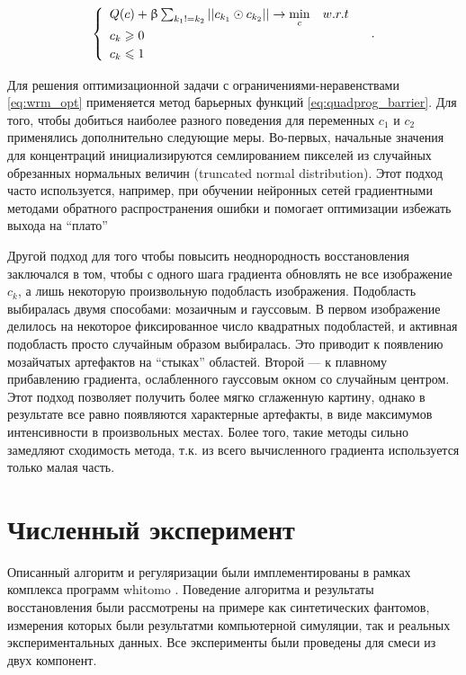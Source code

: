 \begin{equation}
\label{eq:wrm_opt}
  \begin{cases}
    \begin{array}{lc}
    Q(c) + \upbeta\sum_{k_1 != k_2}\left|\left| c_{k_1} \odot c_{k_2} \right|\right| \to \min \limits_c & w.r.t \\
    c_k \geqslant 0 & \\
    c_k \leqslant 1
    \end{array}
  \end{cases}.
\end{equation}

Для решения оптимизационной задачи с ограничениями-неравенствами \eqref{eq:wrm_opt} применяется метод барьерных функций \eqref{eq:quadprog_barrier}.
Для того, чтобы добиться наиболее разного поведения для переменных $c_1$ и $c_2$ применялись дополнительно следующие меры.
Во-первых, начальные значения для концентраций инициализируются семлированием пикселей из случайных обрезанных нормальных величин (truncated normal distribution).
Этот подход часто используется, например, при обучении нейронных сетей градиентными методами обратного распространения ошибки и помогает оптимизации избежать выхода на ``плато''

Другой подход для того чтобы повысить неоднородность восстановления заключался в том, чтобы с одного шага градиента обновлять не все изображение $c_k$, а лишь некоторую произвольную подобласть изображения.
Подобласть выбиралась двумя способами: мозаичным и гауссовым.
В первом изображение делилось на некоторое фиксированное число квадратных подобластей, и активная подобласть просто случайным образом выбиралась.
Это приводит к появлению мозайчатых артефактов на ``стыках'' областей.
Второй --- к плавному прибавлению градиента, ослабленного гауссовым окном со случайным центром.
Этот подход позволяет получить более мягко сглаженную картину, однако в результате все равно появляются характерные артефакты, в виде максимумов интенсивности в произвольных местах.
Более того, такие методы сильно замедляют сходимость метода, т.к. из всего вычисленного градиента используется только малая часть.

\section{Численный эксперимент}
Описанный алгоритм и регуляризации были имплементированы в рамках комплекса программ whitomo \cite{whitomo}.
Поведение алгоритма и результаты восстановления были рассмотрены на примере как синтетических фантомов, измерения которых были результатми компьютерной симуляции, так и реальных экспериментальных данных.
Все эксперименты были проведены для смеси из двух компонент.

